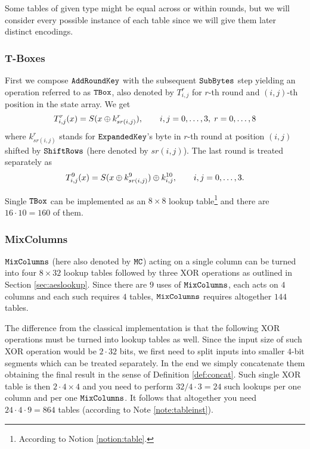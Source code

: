 \begin{note}
\label{note:tableinst}
	Some tables of given type might be equal across or within rounds, but we will consider every possible instance of each table since we will give them later distinct encodings.
\end{note}

\subsubsection{T-Boxes}
	
	First we compose $\texttt{AddRoundKey}$ with the subsequent $\texttt{SubBytes}$ step yielding an operation referred to as $\texttt{TBox}$, also denoted by $T_{i,j}^r$ for $r$-th round and $(i,j)$-th position in the state array. We get
	\begin{equation}
		T_{i,j}^r(x) = S(x\oplus k_{sr(i,j)}^r) , \qquad i,j=0 , \ldots , 3,\;r=0 , \ldots , 8
	\end{equation}
	where $k_{sr(i,j)}^r$ stands for $\texttt{ExpandedKey}$'s byte in $r$-th round at position $(i,j)$ shifted by $\texttt{ShiftRows}$ (here denoted by $sr(i,j)$). The last round is treated separately as
	\begin{equation}
	\label{eq:lasttbox}
		T_{i,j}^{9}(x) = S(x\oplus k_{sr(i,j)}^9) \oplus k_{i,j}^{10} , \qquad i,j=0 , \ldots , 3 .
	\end{equation}
	
	Single $\texttt{TBox}$ can be implemented as an $8\times 8$ lookup table\footnote{According to Notion \ref{notion:table}.} and there are $16\cdot 10 = 160$ of them.

\subsubsection{MixColumns}
	
	$\texttt{MixColumns}$ (here also denoted by $\texttt{MC}$) acting on a single column can be turned into four $8\times 32$ lookup tables followed by three XOR operations as outlined in Section \ref{sec:aeslookup}. Since there are $9$ uses of $\texttt{MixColumns}$, each acts on $4$ columns and each such requires $4$ tables, $\texttt{MixColumns}$ requires altogether $144$ tables.
	
	The difference from the classical implementation is that the following XOR operations must be turned into lookup tables as well. Since the input size of such XOR operation would be $2\cdot 32$ bits, we first need to split inputs into smaller $4$-bit segments which can be treated separately. In the end we simply concatenate them obtaining the final result in the sense of Definition \ref{def:concat}. Such single XOR table is then $2\cdot 4\times 4$ and you need to perform $32/4\cdot 3=24$ such lookups per one column and per one $\texttt{MixColumns}$. It follows that altogether you need $24\cdot 4\cdot 9 = 864$ tables (according to Note \ref{note:tableinst}).

